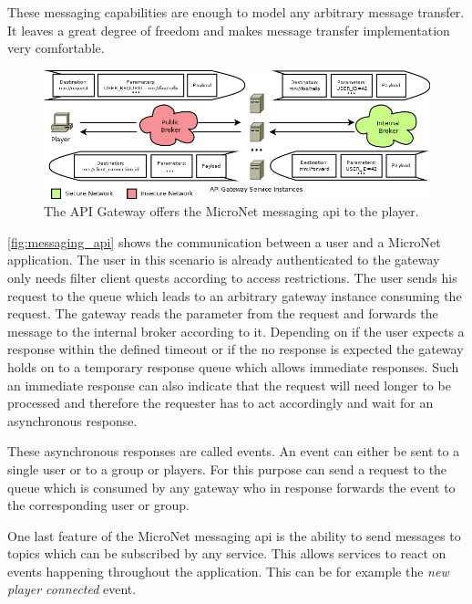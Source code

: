 These messaging capabilities are enough to model any arbitrary message transfer.
It leaves a great degree of freedom and makes message transfer implementation
very comfortable. 

\begin{figure}
	\centering
	\hspace*{-1.5cm}
	\includegraphics[width=1.2\textwidth]{images/architecture/MessagingAPI}
	\caption{The API Gateway offers the MicroNet messaging \gls{api} to the player.}
	\label{fig:messaging_api}
\end{figure}

\autoref{fig:messaging_api} shows the communication between a user and a
MicroNet application. The user in this scenario is already authenticated to the
gateway only needs filter client quests according to access restrictions. The
user sends his request to the  queue which leads to an
arbitrary gateway instance consuming the request. The gateway reads the
 parameter from the request and forwards the message to the
internal broker according to it. Depending on if the user expects a response
within the defined timeout or if the no response is expected the gateway holds
on to a temporary response queue which allows immediate responses. Such an
immediate response can also indicate that the request will need longer to be
processed and therefore the requester has to act accordingly and wait for an
asynchronous response.

These asynchronous responses are called events. An event can either be sent to a
single user or to a group or players. For this purpose \mss{} can send a request
to the  queue which is consumed by any gateway who in
response forwards the event to the corresponding user or group.

One last feature of the MicroNet messaging \gls{api} is the ability to send messages
to topics which can be subscribed by any service. This allows services to react
on events happening throughout the application. This can be for example the
\textit{new player connected} event.











